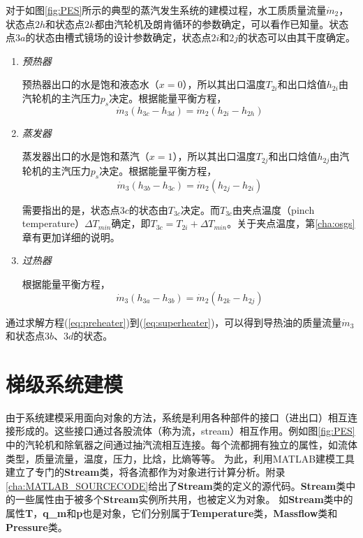 对于如图\ref{fig:PES}所示的典型的蒸汽发生系统的建模过程，水工质质量流量$\dot{m}_2$，状态点$2h$和状态点$2k$都由汽轮机及朗肯循环的参数确定，可以看作已知量。状态点$3a$的状态由槽式镜场的设计参数确定，状态点$2i$和$2j$的状态可以由其干度确定。

\begin{enumerate}[label=(\arabic*)]
  \item \emph{预热器}
  
\setlength\parindent{2em}预热器出口的水是饱和液态水（$x = 0$），所以其出口温度$T_{2i}$和出口焓值$h_{2i}$由汽轮机的主汽压力$p_s$决定。根据能量平衡方程，
  \begin{equation}
  \dot{m}_3 (h_{3c}-h_{3d})=\dot{m}_2 (h_{2i} - h_{2h})
  \label{eq:preheater}
\end{equation}

  \item \emph{蒸发器}
  
  蒸发器出口的水是饱和蒸汽（$x = 1$），所以其出口温度$T_{2j}$和出口焓值$h_{2j}$由汽轮机的主汽压力$p_s$决定。根据能量平衡方程，
  \begin{equation}
  \dot{m}_3 (h_{3b}-h_{3c})=\dot{m}_2 (h_{2j} - h_{2i})
  \label{eq:evaporator}
\end{equation}

	需要指出的是，状态点$3c$的状态由$T_{3c}$决定。而$T_{3c}$由夹点温度（pinch temperature）$\Delta T_{min}$确定，即$T_{3c} = T_{2i} + \Delta T_{min}$。关于夹点温度，第\ref{cha:osgs}章有更加详细的说明。
  
  \item \emph{过热器}
  
  根据能量平衡方程，
  \begin{equation}
  \dot{m}_3 (h_{3a}-h_{3b})=\dot{m}_2 (h_{2k} - h_{2j})
  \label{eq:superheater}
\end{equation}

\end{enumerate}

通过求解方程(\ref{eq:preheater})到(\ref{eq:superheater})，可以得到导热油的质量流量$\dot{m}_3$和状态点$3b$、$3d$的状态。

\section{梯级系统建模}

由于系统建模采用面向对象的方法，系统是利用各种部件的接口（进出口）相互连接形成的。这些接口通过各股流体（称为流，stream）相互作用。例如图\ref{fig:PES}中的汽轮机和除氧器之间通过抽汽流相互连接。每个流都拥有独立的属性，如流体类型，质量流量，温度，压力，比焓，比熵等等。
为此，利用MATLAB建模工具建立了专门的\textbf{Stream}类，将各流都作为对象进行计算分析。附录\ref{cha:MATLAB_SOURCECODE}给出了\textbf{Stream}类的定义的源代码。\textbf{Stream}类中的一些属性由于被多个\textbf{Stream}实例所共用，也被定义为对象。
如\textbf{Stream}类中的属性\textbf{T}，\textbf{q\_m}和\textbf{p}也是对象，它们分别属于\textbf{Temperature}类，\textbf{Massflow}类和\textbf{Pressure}类。

